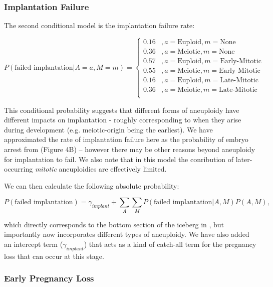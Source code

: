 \documentclass{article}
\begin{document}
\subsubsection*{Implantation Failure}

The second conditional model is the implantation failure rate: 

\begin{equation}
P(\text{failed implantation} | A=a, M=m) = \begin{cases}
0.16 &, a = \text{Euploid}, m = \text{None}\\
0.36 &, a = \text{Meiotic}, m = \text{None}\\
0.57 &, a = \text{Euploid}, m = \text{Early-Mitotic}\\
0.55 &, a = \text{Meiotic}, m = \text{Early-Mitotic}\\
0.16 &, a = \text{Euploid}, m = \text{Late-Mitotic}\\
0.36 &, a = \text{Meiotic}, m = \text{Late-Mitotic}\\
\end{cases}
\end{equation}

This conditional probability suggests that different forms of aneuploidy have different impacts on implantation - roughly corresponding to when they arise during development (e.g. meiotic-origin being the earliest).  We have approximated the rate of implantation failure here as the probability of embryo arrest from \citep{McCoy2023-dg} (Figure 4B) -- however there may be other reasons beyond aneuploidy for implantation to fail. We also note that in this model the conribution of later-occurring \textit{mitotic} aneuploidies are effectively limited.   

We can then calculate the following absolute probability:

\begin{equation}
P(\text{failed implantation}) = \gamma_{implant} + \sum_{A}\sum_{M} P(\text{failed implantation} | A, M) P(A, M) ,
\end{equation}

which directly corresponds to the bottom section of the iceberg in \citep{Macklon2002-zn}, but importantly now incorporates different types of aneuploidy. We have also added an intercept term ($\gamma_{implant}$) that acts as a kind of catch-all term for the pregnancy loss that can occur at this stage.   

\subsubsection*{Early Pregnancy Loss}
\end{document}
